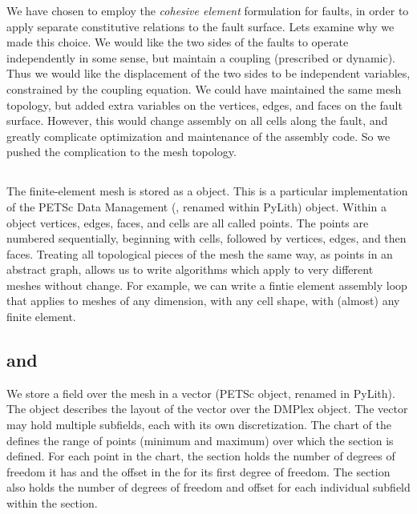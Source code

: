 We have chosen to employ the \textit{cohesive element} formulation for faults, in order to apply separate constitutive
relations to the fault surface. Lets examine why we made this choice. We would like the two sides of the faults to
operate independently in some sense, but maintain a coupling (prescribed or dynamic). Thus we would like the
displacement of the two sides to be independent variables, constrained by the coupling equation. We could have
maintained the same mesh topology, but added extra variables on the vertices, edges, and faces on the fault
surface. However, this would change assembly on all cells along the fault, and greatly complicate optimization and
maintenance of the assembly code. So we pushed the complication to the mesh topology.

\subsection{}

The finite-element mesh is stored as a  object. This is
a particular implementation of the PETSc Data Management (,
renamed  within PyLith) object. Within a
 object vertices, edges, faces, and cells are all
called points. The points are numbered sequentially, beginning with
cells, followed by vertices, edges, and then faces. Treating all topological pieces of the mesh the same way, as points
in an abstract graph, allows us to write algorithms which apply to very different meshes without change. For example, we
can write a fintie element assembly loop that applies to meshes of any dimension, with any cell shape, with (almost) any
finite element.


\subsection{ and }

We store a field over the mesh in a vector (PETSc  object,
renamed  in PyLith). The  object
describes the layout of the vector over the DMPlex object. The vector
may hold multiple subfields, each with its own discretization. The
chart of the  defines the range of points
(minimum and maximum) over which the section is defined. For each
point in the chart, the section holds the number of degrees of freedom
it has and the offset in the  for its first degree of
freedom. The section also holds the number of degrees of freedom and
offset for each individual subfield within the section.

